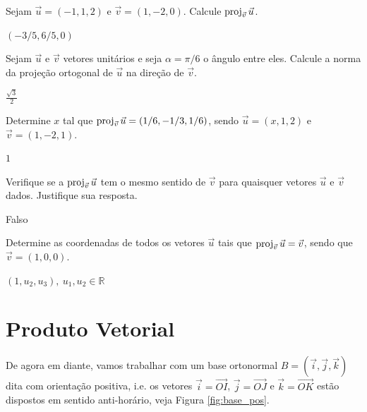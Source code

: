 \begin{exer}
  Sejam $\vec{u}=(-1,1,2)$ e $\vec{v}=(1,-2,0)$. Calcule $\operatorname{proj}_{\vec{v}}\vec{u}$.
\end{exer}
\begin{resp}
  $(-3/5, 6/5, 0)$
\end{resp}

\begin{exer}
  Sejam $\vec{u}$ e $\vec{v}$ vetores unitários e seja $\alpha = \pi/6$ o ângulo entre eles. Calcule a norma da projeção ortogonal de $\vec{u}$ na direção de $\vec{v}$.
\end{exer}
\begin{resp}
  $\frac{\sqrt{3}}{2}$
\end{resp}

\begin{exer}
  Determine $x$ tal que $\operatorname{proj}_{\vec{v}}\vec{u}=(1/6, -1/3, 1/6)$, sendo $\vec{u}=(x,1,2)$ e $\vec{v}=(1,-2,1)$.
\end{exer}
\begin{resp}
  $1$
\end{resp}

\begin{exer}
  Verifique se a $\operatorname{proj}_{\vec{v}}\vec{u}$ tem o mesmo sentido de $\vec{v}$ para quaisquer vetores $\vec{u}$ e $\vec{v}$ dados. Justifique sua resposta.
\end{exer}
\begin{resp}
  Falso
\end{resp}

\begin{exer}
  Determine as coordenadas de todos os vetores $\vec{u}$ tais que $\operatorname{proj}_{\vec{v}}\vec{u}=\vec{v}$, sendo que $\vec{v}=(1,0,0)$.
\end{exer}
\begin{resp}
  $(1,u_2,u_3),~u_1,u_2\in\mathbb{R}$
\end{resp}

\section{Produto Vetorial}\label{cap_prodvet_sec_prodvet}
\badgeRevisar

De agora em diante, vamos trabalhar com um base ortonormal $B = (\vec{i}, \vec{j}, \vec{k})$ dita com orientação positiva, i.e. os vetores $\vec{i} = \overrightarrow{OI}$, $\vec{j} = \overrightarrow{OJ}$ e $\vec{k}=\overrightarrow{OK}$ estão dispostos em sentido anti-horário, veja Figura \ref{fig:base_pos}.

